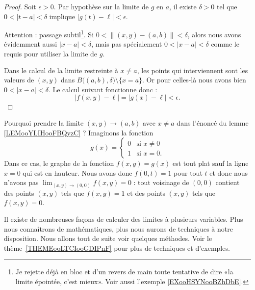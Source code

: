 \begin{proof}
	Soit \( \epsilon>0\). Par hypothèse sur la limite de \( g\) en \( a\), il existe \( \delta>0\) tel que \( 0<| t-a |<\delta\) implique \( | g(t)-\ell |<\epsilon\).

	Attention : passage subtil\footnote{Je rejette déjà en bloc et d'un revers de main toute tentative de dire «la limite épointée, c'est mieux». Voir aussi l'exemple \ref{EXooHSYNooBZhDbE}.}.  Si \( 0<\| (x,y)-(a,b) \|<\delta\), alors nous avons évidemment aussi \( | x-a |<\delta\), mais pas spécialement \( 0<| x-a |<\delta\) comme le requis pour utiliser la limite de \( g\).

	Dans le calcul de la limite restreinte à \( x\neq a\), les points qui interviennent sont les valeurs de \( (x,y)\) dans \( B\big( (a,b),\delta \big)\setminus\{ x=a \}\). Or pour celles-là nous avons bien \( 0<| x-a |<\delta\). Le calcul suivant fonctionne donc :
	\begin{equation}
		| f(x,y)-\ell |=| g(x)-\ell |<\epsilon.
	\end{equation}
\end{proof}

\begin{example}     \label{EXooHSYNooBZhDbE}
	Pourquoi prendre la limite \( (x,y)\to (a,b)\) avec \( x\neq a\) dans l'énoncé du lemme \ref{LEMooYLIHooFBQyzC} ? Imaginons la fonction
	\begin{equation}
		g(x)=\begin{cases}
			0 & \text{si } x\neq 0 \\
			1 & \text{si } x=0.
		\end{cases}
	\end{equation}
	Dans ce cas, le graphe de la fonction \( f(x,y)=g(x)\) est tout plat sauf la ligne \( x=0\) qui est en hauteur. Nous avons donc \( f(0,t)=1\) pour tout \( t\) et donc nous n'avons pas \( \lim_{(x,y)\to (0,0)} f(x,y)=0\) :  tout voisinage de \( (0,0)\) contient des points \( (x,y)\) tels que \( f(x,y)=1\) et des points \( (x,y)\) tels que \( f(x,y)=0\).
\end{example}

\begin{normaltext}
	Il existe de nombreuses façons de calculer des limites à plusieurs variables. Plus nous connaîtrons de mathématiques, plus nous aurons de techniques à notre disposition. Nous allons tout de suite voir quelques méthodes. Voir le thème~\ref{THEMEooLTCIooGDIPnF} pour plus de techniques et d'exemples.
\end{normaltext}


